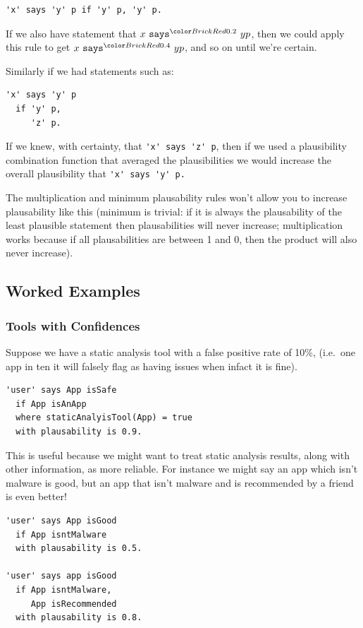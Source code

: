 \documentclass[thesis.tex]{subfiles}
\begin{document}
\begin{lstlisting} 
'x' says 'y' p if 'y' p, 'y' p.
\end{lstlisting}

If we also have statement that $x \says{0.2} y p$,
then we could apply this rule to get $x \says{0.4} y p$, and so on
until we're certain.

Similarly if we had statements  such as:
\begin{lstlisting} 
'x' says 'y' p 
  if 'y' p,
     'z' p.
\end{lstlisting}

If we knew, with certainty, that \lstinline!'x' says 'z' p!, then if
we used a plausibility combination function that averaged the
plausibilities we would increase the overall plausibility that
\lstinline!'x' says 'y' p.!

The multiplication and minimum plausability rules won't allow you to
increase plausability like this (minimum is trivial: if it is always
the plausability of the least plausible statement then plausabilities
will never increase; multiplication works because if all
plausabilities are between 1 and 0, then the product will also never
increase).

\subsection{Worked Examples}

\subsubsection{Tools with Confidences}

Suppose we have a static analysis tool with a false positive rate of
10\%, (i.e.~one app in ten it will falsely flag as having issues when
infact it is fine).

\begin{lstlisting}
'user' says App isSafe
  if App isAnApp
  where staticAnalyisTool(App) = true
  with plausability is 0.9.
\end{lstlisting}

This is useful because we might want to treat static analysis results,
along with other information, as more reliable.  For instance we might
say an app which isn't malware is good, but an app that isn't malware
and is recommended by a friend is even better!

\begin{lstlisting}
'user' says App isGood
  if App isntMalware
  with plausability is 0.5.

'user' says app isGood
  if App isntMalware,
     App isRecommended
  with plausability is 0.8.
\end{lstlisting}
\end{document}
